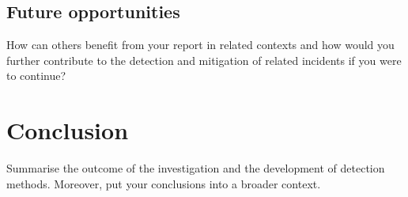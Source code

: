 \subsection{Future opportunities}
How can others benefit from your report in related contexts and how would you further contribute to the detection and mitigation of related incidents if you were to continue?

\section{Conclusion} \label{section: conclusion}
Summarise the outcome of the investigation and the development of detection methods. Moreover, put your conclusions into a broader context.